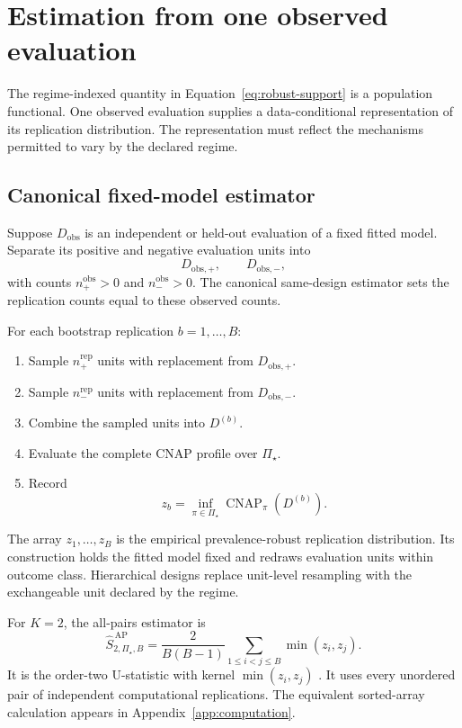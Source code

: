 \documentclass[11pt]{article}
\newcommand{\CNAP}{\operatorname{CNAP}}
\newcommand{\PSet}{\Pi_\star}
\theoremstyle{remark}
\begin{document}
\section{Estimation from one observed evaluation}
\label{sec:estimation}

The regime-indexed quantity in Equation~\eqref{eq:robust-support} is a population functional. One observed evaluation supplies a data-conditional representation of its replication distribution. The representation must reflect the mechanisms permitted to vary by the declared regime.

\subsection{Canonical fixed-model estimator}

Suppose $D_{\mathrm{obs}}$ is an independent or held-out evaluation of a fixed fitted model. Separate its positive and negative evaluation units into
\[
D_{\mathrm{obs},+},
\qquad
D_{\mathrm{obs},-},
\]
with counts $n_+^{\mathrm{obs}}>0$ and $n_-^{\mathrm{obs}}>0$. The canonical same-design estimator sets the replication counts equal to these observed counts.

For each bootstrap replication $b=1,\ldots,B$:
\begin{enumerate}
\item Sample $n_+^{\mathrm{rep}}$ units with replacement from $D_{\mathrm{obs},+}$.
\item Sample $n_-^{\mathrm{rep}}$ units with replacement from $D_{\mathrm{obs},-}$.
\item Combine the sampled units into $D^{(b)}$.
\item Evaluate the complete CNAP profile over $\PSet$.
\item Record
\begin{equation}
z_b
=
\inf_{\pi\in\PSet}
\CNAP_\pi(D^{(b)}).
\label{eq:bootstrap-robust-effect}
\end{equation}
\end{enumerate}

The array $z_1,\ldots,z_B$ is the empirical prevalence-robust replication distribution. Its construction holds the fitted model fixed and redraws evaluation units within outcome class. Hierarchical designs replace unit-level resampling with the exchangeable unit declared by the regime.

For $K=2$, the all-pairs estimator is
\begin{equation}
\widehat S_{2,\PSet,B}^{\,\mathrm{AP}}
=
\frac{2}{B(B-1)}
\sum_{1\leq i<j\leq B}
\min(z_i,z_j).
\label{eq:all-pairs-estimator}
\end{equation}
It is the order-two U-statistic with kernel $\min(z_i,z_j)$ \cite{hoeffding1948ustat}. It uses every unordered pair of independent computational replications. The equivalent sorted-array calculation appears in Appendix~\ref{app:computation}.
\end{document}
